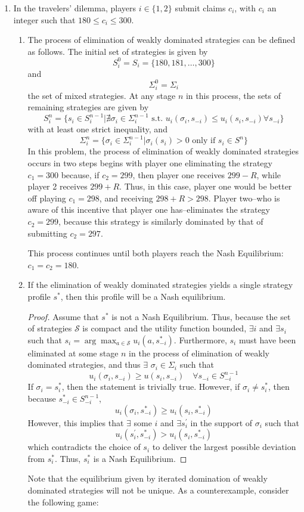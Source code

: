 \documentclass[11pt]{article}
\begin{document}
\begin{enumerate}
	\item In the travelers' dilemma, players $ i\in \{1,2\} $ submit claims $ c_i $, with $ c_i $ an integer such that $ 180 \leq c_i \leq 300 $. 
	\begin{enumerate}
		\item The process of elimination of weakly dominated strategies can be defined as follows. The initial set of strategies is given by 
		\[S_i^0 = S_i = \{180, 181, \dots, 300 \} \]
		and
		\[\Sigma_i^0 = \Sigma_i \]
		the set of mixed strategies. At any stage $ n $ in this process, the sets of remaining strategies are given by 
		\[S_i^n = \{s_i \in S_i^{n - 1} | \nexists \sigma_i \in \Sigma_i^{n - 1} \text{ s.t. } u_i(\sigma_i, s_{-i}) \leq u_i(s_i, s_{-i}) \forall s_{-i} \}\]
		with at least one strict inequality, and
		\[\Sigma_i^n = \{\sigma_i \in \Sigma_i^{n - 1} | \sigma_i(s_i) > 0 \text{ only if } s_i \in S^n\}\]
		In this problem, the process of elimination of weakly dominated strategies occurs in two steps begins with player one eliminating the strategy $ c_1 = 300 $ because, if $ c_2 = 299 $, then player one receives $ 299 - R $, while player 2 receives $ 299 + R $. Thus, in this case, player one would be better off playing $ c_1 = 298 $, and receiving $ 298 + R > 298 $. Player two--who is aware of this incentive that player one has--eliminates the strategy $ c_2 = 299 $, because this strategy is similarly dominated by that of submitting $ c_2 = 297 $. 
		
		This process continues until both players reach the Nash Equilibrium: $ c_1 = c_2 = 180 $. 
		
		\item If the elimination of weakly dominated strategies yields a single strategy profile $ s^* $, then this profile will be a Nash equilibrium. 
		\begin{proof}
			Assume that $ s^* $ is not a Nash Equilibrium. Thus, because the set of strategies $ \mathcal{S} $ is compact and the utility function bounded, $ \exists i $ and $ \exists s_i $ such that $ s_i = \arg \max_{a\in\mathcal{S}} u_i(a, s_{-i}^*)  $. Furthermore, $ s_i $ must have been eliminated at some stage $ n $ in the process of elimination of weakly dominated strategies, and thus $\exists$ $ \sigma_i\in\Sigma_i $ such that 
			\[u_i(\sigma_i, s_{-i}) \geq u(s_i, s_{-i}) \quad \forall s_{-i}\in S_{-i}^{n - 1} \]
			If $ \sigma_i = s_i^* $, then the statement is trivially true. However, if $ \sigma_i \neq s_i^* $, then because $ s_{-i}^*\in S_{-i}^{n - 1} $,
			\[u_i(\sigma_i, s_{-i}^*) \geq u_i(s_i, s_{-i}^*) \]
			However, this implies that $ \exists $ some $ i $ and $ \exists s_i^\prime $ in the support of $ \sigma_i $ such that 
			\[u_i(s_i^\prime, s_{-i}^*) > u_i(s_i, s_{-i}^*) \]
			which contradicts the choice of $ s_i $ to deliver the largest possible deviation from $ s_i^* $. Thus, $ s_i^* $ is a Nash Equilibrium.
		\end{proof}
		Note that the equilibrium given by iterated domination of weakly dominated strategies will not be unique. As a counterexample, consider the following game:
		

\end{enumerate}
\end{enumerate}
\end{document}

